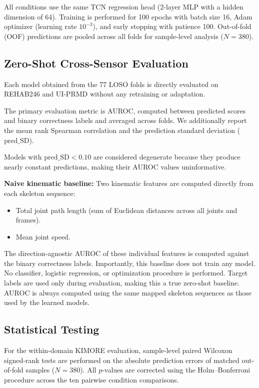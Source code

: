 \documentclass[10pt,journal]{IEEEtran}
\begin{document}
All conditions use the same TCN regression head (2-layer MLP with a hidden dimension of 64). Training is performed for 100 epochs with batch size 16, Adam optimizer (learning rate $10^{-3}$), and early stopping with patience 100. Out-of-fold (OOF) predictions are pooled across all folds for sample-level analysis ($N = 380$).

\subsection{Zero-Shot Cross-Sensor Evaluation}
\label{sec:zeroshot}

Each model obtained from the 77 LOSO folds is directly evaluated on REHAB246 and UI-PRMD without any retraining or adaptation.

The primary evaluation metric is AUROC, computed between predicted scores and binary correctness labels and averaged across folds. We additionally report the mean rank Spearman correlation and the prediction standard deviation ($\text{pred\_SD}$).

Models with $\text{pred\_SD} < 0.10$ are considered degenerate because they produce nearly constant predictions, making their AUROC values uninformative.

\textbf{Naive kinematic baseline:} Two kinematic features are computed directly from each skeleton sequence:
\begin{itemize}
    \item Total joint path length (sum of Euclidean distances across all joints and frames).
    \item Mean joint speed.
\end{itemize}
The direction-agnostic AUROC of these individual features is computed against the binary correctness labels. Importantly, this baseline does not train any model. No classifier, logistic regression, or optimization procedure is performed. Target labels are used only during evaluation, making this a true zero-shot baseline. AUROC is always computed using the same mapped skeleton sequences as those used by the learned models.

\subsection{Statistical Testing}
\label{sec:stats}

For the within-domain KIMORE evaluation, sample-level paired Wilcoxon signed-rank tests are performed on the absolute prediction errors of matched out-of-fold samples ($N = 380$). All $p$-values are corrected using the Holm--Bonferroni procedure across the ten pairwise condition comparisons.
\end{document}
